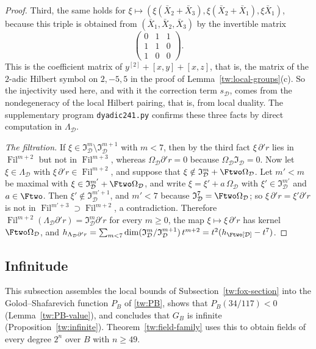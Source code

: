 \begin{proof}
Third, the same holds for $\xi\mapsto(\xi(\bar X_2+\bar X_3),\xi(\bar X_2+\bar X_1),\xi\bar X_1)$, because this
triple is obtained from $(\bar X_1,\bar X_2,\bar X_3)$ by the invertible matrix
\[
 \begin{pmatrix}0&1&1\\1&1&0\\1&0&0\end{pmatrix}.
\]
This is the coefficient matrix of $y^{[2]}+[x,y]+[x,z]$, that is, the matrix
of the $2$-adic Hilbert symbol on $2,-5,5$ in the proof of
Lemma~\ref{tw:local-groups}(c). So the injectivity used here, and with it
the correction term $s_{\mathcal D}$, comes from the nondegeneracy of the local Hilbert pairing,
that is, from local duality. The supplementary program \texttt{dyadic241.py}
confirms these three facts by direct computation in $\Lambda_{\mathcal D}$.

\emph{The filtration.} If $\xi\in\mathfrak I_{\mathcal D}^m\setminus\mathfrak I_{\mathcal D}^{m+1}$
with $m<7$, then by the third fact $\xi\,\partial'r$ lies in $\operatorname{Fil}^{m+2}$ but not
in $\operatorname{Fil}^{m+3}$, whereas $\Omega_{\mathcal D}\partial'r=0$ because $\Omega_{\mathcal D}\mathfrak I_{\mathcal D}=0$.
Now let $\xi\in\Lambda_{\mathcal D}$ with $\xi\,\partial'r\in \operatorname{Fil}^{m+2}$, and suppose that
$\xi\notin\mathfrak I_{\mathcal D}^m+\Ftwo\Omega_{\mathcal D}$. Let $m'<m$ be maximal with
$\xi\in\mathfrak I_{\mathcal D}^{m'}+\Ftwo\Omega_{\mathcal D}$, and write $\xi=\xi'+a\,\Omega_{\mathcal D}$
with $\xi'\in\mathfrak I_{\mathcal D}^{m'}$ and $a\in\Ftwo$. Then
$\xi'\notin\mathfrak I_{\mathcal D}^{m'+1}$, and $m'<7$ because
$\mathfrak I_{\mathcal D}^7=\Ftwo\Omega_{\mathcal D}$; so $\xi\,\partial'r=\xi'\partial'r$ is not in
$\operatorname{Fil}^{m'+3}\supset \operatorname{Fil}^{m+2}$, a contradiction. Therefore
$\operatorname{Fil}^{m+2}(\Lambda_{\mathcal D}\partial'r)=\mathfrak I_{\mathcal D}^m\partial'r$ for every $m\ge0$,
the map $\xi\mapsto\xi\,\partial'r$ has kernel $\Ftwo\Omega_{\mathcal D}$, and
$h_{\Lambda_{\mathcal D}\partial'r}=\sum_{m<7}\dim(\mathfrak I_{\mathcal D}^m/\mathfrak I_{\mathcal D}^{m+1})\,t^{m+2}=t^2(h_{\Ftwo[\mathcal D]}-t^7)$.
\end{proof}

\subsection{Infinitude}\label{tw:infinite-section}
This subsection assembles the local bounds of
Subsection~\ref{tw:fox-section} into the Golod--Shafarevich function $P_B$
of \eqref{tw:PB}, shows that $P_B(34/117)<0$ (Lemma~\ref{tw:PB-value}), and
concludes that $G_B$ is infinite (Proposition~\ref{tw:infinite}). Theorem~\ref{tw:field-family}
uses this to obtain fields of every degree $2^n$ over $B$ with $n\ge49$.

